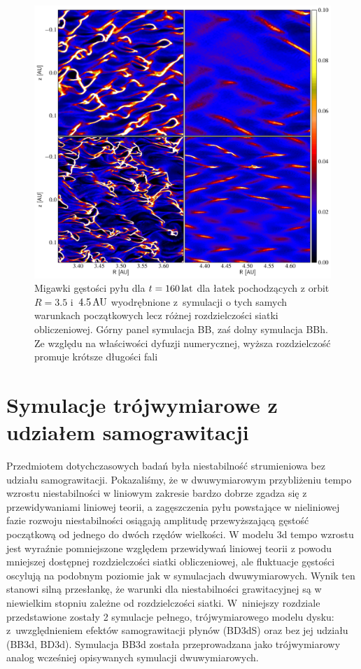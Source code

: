 \begin{figure}
   \includegraphics[width=0.98\linewidth]{figures/fig10}
   \caption{Migawki gęstości pyłu dla $t = 160\hbox{$\thinspace\textrm{lat}$}$ dla łatek pochodzących z
      orbit $R=3.5$ i~$4.5\hbox{$\thinspace\textrm{AU}$}$ wyodrębnione z~symulacji o tych samych warunkach
      początkowych lecz różnej rozdzielczości siatki obliczeniowej. Górny panel
      symulacja BB, zaś dolny symulacja BBh. Ze względu na właściwości
      dyfuzji numerycznej, wyższa rozdzielczość promuje krótsze długości
      fali}
   \label{fig10} 
\end{figure}

\section{Symulacje trójwymiarowe z udziałem samograwitacji}
Przedmiotem dotychczasowych badań była niestabilność strumieniowa bez udziału
samograwitacji. Pokazaliśmy, że w dwuwymiarowym przybliżeniu tempo wzrostu
niestabilności w liniowym zakresie bardzo dobrze zgadza się z przewidywaniami
liniowej teorii, a zagęszczenia pyłu powstające w nieliniowej fazie rozwoju
niestabilności osiągają amplitudę przewyższającą gęstość początkową od jednego
do dwóch rzędów wielkości. W modelu 3d tempo wzrostu jest wyraźnie pomniejszone
względem przewidywań liniowej teorii z powodu mniejszej dostępnej rozdzielczości
siatki obliczeniowej, ale fluktuacje gęstości oscylują na podobnym poziomie jak
w symulacjach dwuwymiarowych. Wynik ten stanowi silną przesłankę, że warunki dla
niestabilności grawitacyjnej są w niewielkim stopniu zależne od rozdzielczości
siatki. W~niniejszy rozdziale przedstawione zostały 2 symulacje pełnego,
trójwymiarowego modelu dysku: z~uwzględnieniem efektów samograwitacji płynów
(BD3dS) oraz bez jej udziału (BB3d, BD3d). Symulacja BB3d została przeprowadzana
jako trójwymiarowy analog wcześniej opisywanych symulacji dwuwymiarowych.


